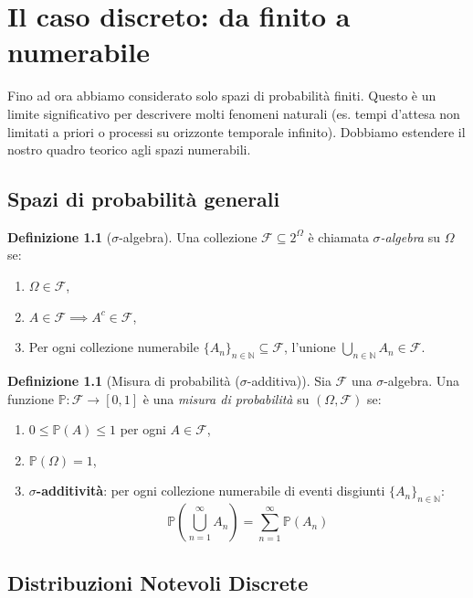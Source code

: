\documentclass[11pt, a4paper]{report}
\theoremstyle{plain}
\theoremstyle{definition}
\newtheorem{definition}[theorem]{Definizione}
\theoremstyle{remark}
\newcommand{\PP}{\mathbb{P}}
\newcommand{\F}{\mathcal{F}}
\newcommand{\N}{\mathbb{N}}
\newcommand{\1}{\mathbf{1}}
\begin{document}
\newpage

\chapter{Il caso discreto: da finito a numerabile}

Fino ad ora abbiamo considerato solo spazi di probabilità finiti. Questo è un limite significativo per descrivere molti fenomeni naturali (es. tempi d'attesa non limitati a priori o processi su orizzonte temporale infinito).
Dobbiamo estendere il nostro quadro teorico agli spazi numerabili.

\section{Spazi di probabilità generali}

\begin{definition}[$\sigma$-algebra]
Una collezione $\F \subseteq 2^\Omega$ è chiamata \emph{$\sigma$-algebra} su $\Omega$ se:
\begin{enumerate}
    \item $\Omega \in \F$,
    \item $A \in \F \implies A^c \in \F$,
    \item Per ogni collezione numerabile $\{A_n\}_{n \in \N} \subseteq \F$, l'unione $\bigcup_{n \in \N} A_n \in \F$.
\end{enumerate}
\end{definition}

\begin{definition}[Misura di probabilità ($\sigma$-additiva)]
Sia $\F$ una $\sigma$-algebra. Una funzione $\PP : \F \to [0, 1]$ è una \emph{misura di probabilità} su $(\Omega, \F)$ se:
\begin{enumerate}
    \item $0 \le \PP(A) \le 1$ per ogni $A \in \F$,
    \item $\PP(\Omega) = 1$,
    \item \textbf{$\sigma$-additività}: per ogni collezione numerabile di eventi disgiunti $\{A_n\}_{n \in \N}$:
    \[ \PP\left(\bigcup_{n=1}^\infty A_n\right) = \sum_{n=1}^\infty \PP(A_n) \]
\end{enumerate}
\end{definition}

\section{Distribuzioni Notevoli Discrete}
\end{document}
